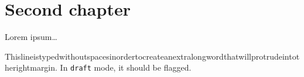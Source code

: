 \chapter{Second chapter}

Lorem ipsum\ldots

Thislineistypedwithoutspacesinordertocreateanextralongwordthatwillprotrudeintotherightmargin. In \texttt{draft} mode, it should be flagged.

\label{exponent-format}
\label{mantissa-format}
\label{opt:be}
\label{range-tracking}
\label{unnorm-math}
